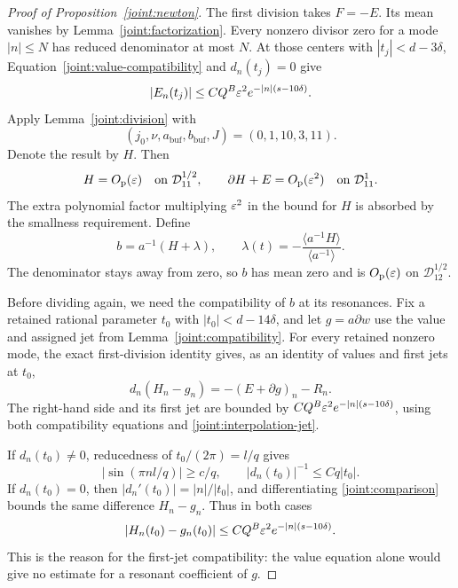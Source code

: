 \begin{proof}[Proof of Proposition~\ref{joint:newton}]
The first division takes \(F=-E\).  Its mean vanishes by
Lemma~\ref{joint:factorization}.  Every nonzero divisor zero for a mode
\(|n|\le N\) has reduced denominator at most \(N\).  At those centers
with \(|t_j|<d-3\delta\), Equation~\eqref{joint:value-compatibility}
and \(d_n(t_j)=0\) give
\[
 |E_n(t_j)|\le CQ^B\varepsilon^2e^{-|n|(s-10\delta)}.
\]
Apply Lemma~\ref{joint:division} with
\[
 (j_0,\nu,a_{\mathrm{buf}},b_{\mathrm{buf}},J)=(0,1,10,3,11).
\]
Denote the result by \(H\).  Then
\begin{equation}
 H=O_{\mathrm p}(\varepsilon)\quad\hbox{on }\mathcal D_{11}^{1/2},
 \qquad
 \partial H+E=O_{\mathrm p}(\varepsilon^2)
          \quad\hbox{on }\mathcal D_{11}^{1}.
 \label{joint:first-division}
\end{equation}
The extra polynomial factor multiplying \(\varepsilon^2\) in the bound for
\(H\) is absorbed by the smallness requirement.  Define
\begin{equation}
 b=a^{-1}(H+\lambda),\qquad
 \lambda(t)=-\frac{\langle a^{-1}H\rangle}{\langle a^{-1}\rangle}.
 \label{joint:mean-correction}
\end{equation}
The denominator stays away from zero, so \(b\) has mean zero and is
\(O_{\mathrm p}(\varepsilon)\) on \(\mathcal D_{12}^{1/2}\).

Before dividing again, we need the compatibility of \(b\) at its
resonances.  Fix a retained rational parameter \(t_0\) with
\(|t_0|<d-14\delta\), and let \(g=a\partial w\) use the value and
assigned jet from Lemma~\ref{joint:compatibility}.  For every retained
nonzero mode, the exact first-division identity gives, as an identity
of values and first jets at \(t_0\),
\begin{equation}
 d_n(H_n-g_n)=-(E+\partial g)_n-R_n.
 \label{joint:comparison}
\end{equation}
The right-hand side and its first jet are bounded by
\(CQ^B\varepsilon^2e^{-|n|(s-10\delta)}\), using both compatibility equations
and \eqref{joint:interpolation-jet}.

If \(d_n(t_0)\ne0\), reducedness of \(t_0/(2\pi)=l/q\) gives
\[
 |\sin(\pi nl/q)|\ge c/q,\qquad
 |d_n(t_0)|^{-1}\le Cq|t_0|.
\]
If \(d_n(t_0)=0\), then
\( |d_n'(t_0)|=|n|/|t_0|\), and differentiating
\eqref{joint:comparison} bounds the same difference \(H_n-g_n\).
Thus in both cases
\[
 |H_n(t_0)-g_n(t_0)|
 \le CQ^B\varepsilon^2 e^{-|n|(s-10\delta)}.
\]
This is the reason for the first-jet compatibility: the value equation
alone would give no estimate for a resonant coefficient of \(g\).


\end{proof}
